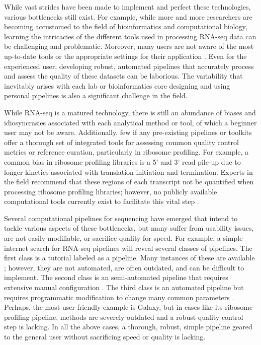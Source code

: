 \documentclass[11pt, a4paper, oneside]{article}
\begin{document}
While vast strides have been made to implement and perfect these technologies, various bottlenecks still exist. For example, while more and more researchers are becoming accustomed to the field of bioinformatics and computational biology, learning the intricacies of the different tools used in processing RNA-seq data can be challenging and problematic. Moreover, many users are not aware of the most up-to-date tools or the appropriate settings for their application \cite{costello_npjsba, funari_science}. Even for the experienced user, developing robust, automated pipelines that accurately process and assess the quality of these datasets can be laborious. The variability that inevitably arises with each lab or bioinformatics core designing and using personal pipelines is also a significant challenge in the field. \par

While RNA-seq is a matured technology, there is still an abundance of biases and idiosyncrasies associated with each analytical method or tool, of which a beginner user may not be aware. Additionally, few if any pre-existing pipelines or toolkits offer a thorough set of integrated tools for assessing common quality control metrics or reference curation, particularly in ribosome profiling. For example, a common bias in ribosome profiling libraries is a 5' and 3' read pile-up \cite{gerashchenko_nar, artieri_gr, hussman_plosg} due to longer kinetics associated with translation initiation and termination. Experts in the field recommend that these regions of each transcript not be quantified when processing ribosome profiling libraries; however, no publicly available computational tools currently exist to facilitate this vital step \cite{ingolia_meth, weinberg_reports}. \par

Several computational pipelines for sequencing have emerged that intend to tackle various aspects of these bottlenecks, but many suffer from usability issues, are not easily modifiable, or sacrifice quality for speed. For example, a simple internet search for RNA-seq pipelines will reveal several classes of pipelines. The first class is a tutorial labeled as a pipeline. Many instances of these are available \cite{encode_pipeline, gdc_pipeline}; however, they are not automated, are often outdated, and can be difficult to implement. The second class is an semi-automated pipeline that requires extensive manual configuration \cite{pavlidis_pipeline, nfcore_pipeline, umcu_pipeline, cellgeni_pipeline}. The third class is an automated pipeline but requires programmatic modification to change many common parameters \cite{dnanexus_pipeline, nextflow_pipeline}. Perhaps, the most user-friendly example is Galaxy, but in cases like its ribosome profiling pipeline, methods are severely outdated and a robust quality control step is lacking. In all the above cases, a thorough, robust, simple pipeline geared to the general user without sacrificing speed or quality is lacking. \par
\end{document}
